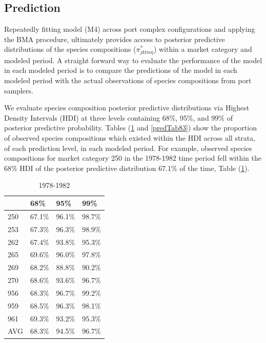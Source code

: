 \documentclass[12pt]{article}
\begin{document}
\subsection{Prediction}\label{prediction}

Repeatedly fitting model (M4) across port complex configurations and
applying the BMA procedure, ultimately provides access to posterior
predictive distributions of the species compositions (\(\pi^*_{jklm\eta}\)) 
within a market category and modeled period. A straight forward way to 
evaluate the performance of the model in each modeled period is to compare the 
predictions of the model in each modeled period with the actual observations 
of species compositions from port samplers.

We evaluate species composition posterior predictive distributions via
Highest Density Intervals (HDI) at three levels containing 68\%, 95\%, and 99\% of posterior
predictive probability. Tables (\ref{predTab78} and \ref{predTab83}) 
show the proportion of observed species compositions which existed within the 
HDI across all strata, of each prediction level, in each modeled period. For 
example, observed species compositions for market category 250 in the 
1978-1982 time period fell within the 68\% HDI of the posterior 
predictive distribution 67.1\% of the time, Table (\ref{predTab78}).

\begin{table}[h!]
\centering
\begin{tabular}[c]{@{}llll@{}}
\hline
& 68\% & 95\% & 99\% \\ \hline
250 & 67.1\% & 96.1\% & 98.7\% \\
253 & 67.3\% & 96.3\% & 98.9\% \\ 
262 & 67.4\% & 93.8\% & 95.3\% \\
265 & 69.6\% & 96.0\% & 97.8\% \\
269 & 68.2\% & 88.8\% & 90.2\% \\
270 & 68.6\% & 93.6\% & 96.7\% \\
956 & 68.3\% & 96.7\% & 99.2\% \\
959 & 68.5\% & 96.3\% & 98.1\% \\
961 & 69.3\% & 93.2\% & 95.3\% \\
AVG & 68.3\% & 94.5\% & 96.7\% \\ \hline
\end{tabular}
\caption{1978-1982}
\label{predTab78}
\end{table}
\end{document}
